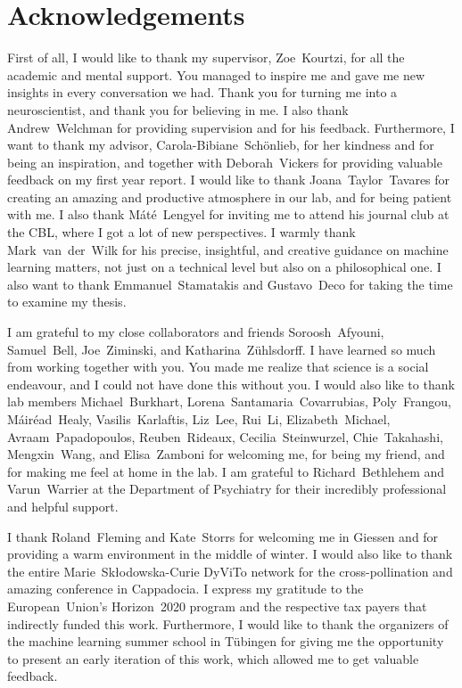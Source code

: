 \chapter*{Acknowledgements}

First of all, I would like to thank my supervisor, Zoe~Kourtzi, for all the academic and mental support.
You managed to inspire me and gave me new insights in every conversation we had.
Thank you for turning me into a neuroscientist, and thank you for believing in me.
I also thank Andrew~Welchman for providing supervision and for his feedback.
Furthermore, I want to thank my advisor, Carola-Bibiane~Schönlieb, for her kindness and for being an inspiration, and together with Deborah~Vickers for providing valuable feedback on my first year report.
I would like to thank Joana~Taylor~Tavares for creating an amazing and productive atmosphere in our lab, and for being patient with me.
I also thank Máté~Lengyel for inviting me to attend his journal club at the CBL, where I got a lot of new perspectives.
I warmly thank Mark~van~der~Wilk for his precise, insightful, and creative guidance on machine learning matters, not just on a technical level but also on a philosophical one.
I also want to thank Emmanuel~Stamatakis and Gustavo~Deco for taking the time to examine my thesis.

I am grateful to my close collaborators and friends Soroosh~Afyouni, Samuel~Bell, Joe~Ziminski, and Katharina~Zühlsdorff.
I have learned so much from working together with you.
You made me realize that science is a social endeavour, and I could not have done this without you.
I would also like to thank lab members Michael~Burkhart, Lorena~Santamaria~Covarrubias, Poly~Frangou, Máiréad~Healy, Vasilis~Karlaftis, Liz~Lee, Rui~Li, Elizabeth~Michael, Avraam~Papadopoulos, Reuben~Rideaux, Cecilia~Steinwurzel, Chie~Takahashi, Mengxin~Wang, and Elisa~Zamboni for welcoming me, for being my friend, and for making me feel at home in the lab.
I am grateful to Richard~Bethlehem and Varun~Warrier at the Department of Psychiatry for their incredibly professional and helpful support.

I thank Roland~Fleming and Kate~Storrs for welcoming me in Giessen and for providing a warm environment in the middle of winter.
I would also like to thank the entire Marie~Sk\l{}odowska-Curie DyViTo network for the cross-pollination and amazing conference in Cappadocia.
I express my gratitude to the European~Union's Horizon~2020 program and the respective tax payers that indirectly funded this work.
Furthermore, I would like to thank the organizers of the machine learning summer school in T\"{u}bingen for giving me the opportunity to present an early iteration of this work, which allowed me to get valuable feedback.

